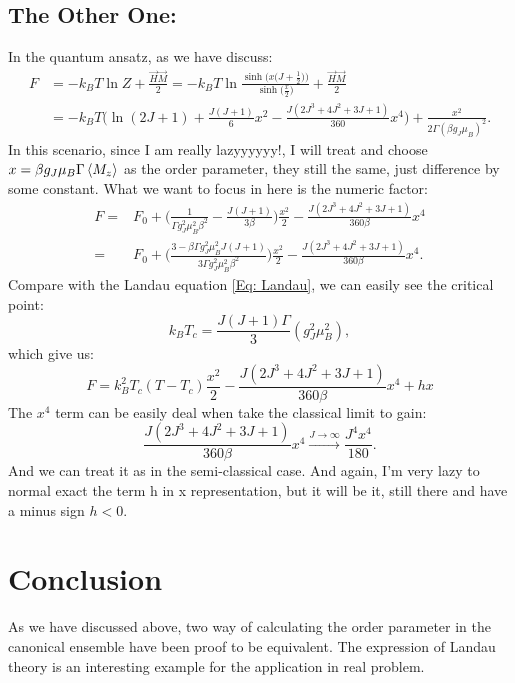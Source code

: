 \documentclass[a4paper]{article}
\begin{document}
\subsection{The Other One:}
\quad In the quantum ansatz, as we have discuss:
\begin{align}
	F &= -k_B T \ln Z + \frac{\vec{H}\vec{M}}{2} = - k_B T \ln \frac{\sinh \big(x \big( J + \frac{1}{2}\big)\big)}{\sinh \big(\frac{x}{2}\big)} + \frac{\vec{H}\vec{M}}{2} \nonumber \\
	&= -k_B T \bigg( \ln (2J + 1)  + \frac{J(J+1)}{6} x^2  - \frac{J(2J^3 + 4J^2 + 3J + 1)}{360}x^4\bigg) + \frac{x^2}{2 \Gamma (\beta g_J\mu_B)^2}.
\end{align}
\quad In this scenario, since I am really lazyyyyyy!, I will treat and choose \(x = \beta g_J \mu_B \Gamma \ev{M_z}\) as the order parameter, they still the same, just difference by some constant. What we want to focus in here is the numeric factor:
\begin{align*}
	F =& F_0 +  \bigg(\frac{1}{\Gamma g_J^2 \mu_B^2 \beta^2} - \frac{J(J+1)}{3\beta}\bigg)\frac{x^2}{2} - \frac{J(2J^3 + 4J^2 + 3J + 1)}{360\beta} x^4\nonumber\\
	=& F_0 + \bigg(\frac{3 - \beta \Gamma g_J^2 \mu_B^2 J(J+1)}{3\Gamma g_J^2 \mu^2_B \beta^2}\bigg) \frac{x^2}{2} - \frac{J(2J^3 + 4J^2 + 3J + 1)}{360\beta} x^4.
\end{align*}
\quad Compare with the Landau equation \eqref{Eq: Landau}, we can easily see the critical point:
\begin{equation}
	k_B T_c = \frac{J(J+1) \Gamma}{3} (g_J^2 \mu_B^2),
\end{equation}
which give us:
\begin{equation}
F =	k_B^2 T_c (T - T_c) \frac{x^2}{2} - \frac{J(2J^3 + 4J^2 + 3J + 1)}{360\beta} x^4 + h x
\end{equation}
The \(x^4\) term can be easily deal when take the classical limit to gain:
\begin{equation*}
	\frac{J(2J^3 + 4J^2 + 3J + 1)}{360\beta} x^4 \xrightarrow{J \to \infty} \frac{J^4 x^4}{180}.
\end{equation*}
\quad And we can treat it as in the semi-classical case. And again, I'm very lazy to normal exact the term h in x representation, but it will be it, still there and have a minus sign \(h < 0\).
\section{Conclusion}
\quad As we have discussed above, two way of calculating the order parameter in the canonical ensemble have been proof to be equivalent. The expression of Landau theory is an interesting example for the application in real problem.
\end{document}
